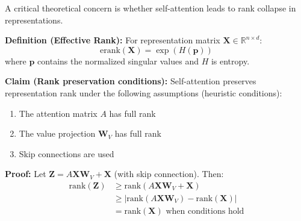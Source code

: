 A critical theoretical concern is whether self-attention leads to rank collapse in representations.

\textbf{Definition (Effective Rank):} For representation matrix $\mathbf{X} \in \mathbb{R}^{n \times d}$:
\begin{equation}
\text{erank}(\mathbf{X}) = \exp\left(H(\mathbf{p})\right)
\end{equation}
where $\mathbf{p}$ contains the normalized singular values and $H$ is entropy.

\textbf{Claim (Rank preservation conditions):} Self-attention preserves representation rank under the following assumptions (heuristic conditions):
\begin{enumerate}
    \item The attention matrix $A$ has full rank
    \item The value projection $\mathbf{W}_V$ has full rank
    \item Skip connections are used
\end{enumerate}

\textbf{Proof:} Let $\mathbf{Z} = A\mathbf{X}\mathbf{W}_V + \mathbf{X}$ (with skip connection). Then:
\begin{align}
\text{rank}(\mathbf{Z}) &\geq \text{rank}(A\mathbf{X}\mathbf{W}_V + \mathbf{X}) \\
&\geq |\text{rank}(A\mathbf{X}\mathbf{W}_V) - \text{rank}(\mathbf{X})| \\
&= \text{rank}(\mathbf{X}) \text{ when conditions hold}
\end{align}
